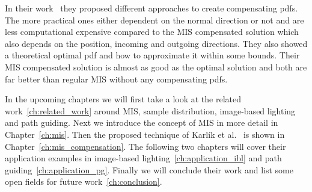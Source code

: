 In their work~\cite{Karlik2019} they proposed different approaches to create compensating pdfs.
The more practical ones either dependent on the normal direction or not and are less computational expensive
compared to the MIS compensated solution which also depends on the position, incoming and outgoing directions.
They also showed a theoretical optimal pdf and how to approximate it within some bounds.
Their MIS compensated solution is almost as good as the optimal solution and both are far better than regular MIS without any compensating pdfs.

In the upcoming chapters we will first take a look at the related work~\ref{ch:related_work} around MIS, sample distribution, image-based lighting and path guiding.
Next we introduce the concept of MIS in more detail in Chapter~\ref{ch:mis}.
Then the proposed technique of Karl\'ik et al.~\cite{Karlik2019} is shown in Chapter~\ref{ch:mis_compensation}.
The following two chapters will cover their application examples in image-based lighting~\ref{ch:application_ibl} and path guiding~\ref{ch:application_pg}.
Finally we will conclude their work and list some open fields for future work~\ref{ch:conclusion}.